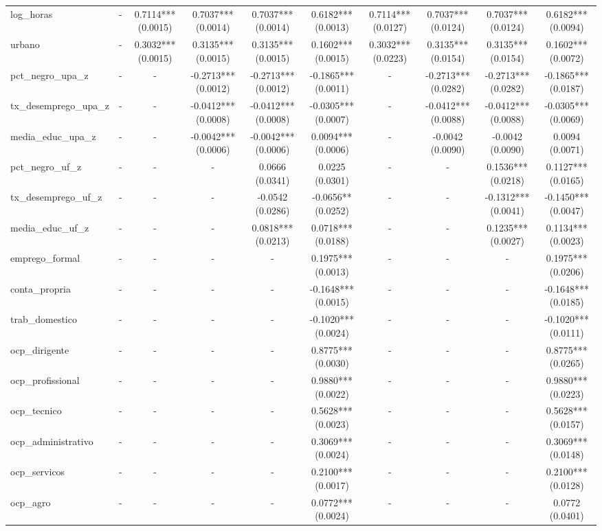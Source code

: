 \begin{table}
\begin{tabular}{lccccccccc}
log_horas & - & 0.7114*** (0.0015) & 0.7037*** (0.0014) & 0.7037*** (0.0014) & 0.6182*** (0.0013) & 0.7114*** (0.0127) & 0.7037*** (0.0124) & 0.7037*** (0.0124) & 0.6182*** (0.0094) \\
urbano & - & 0.3032*** (0.0015) & 0.3135*** (0.0015) & 0.3135*** (0.0015) & 0.1602*** (0.0015) & 0.3032*** (0.0223) & 0.3135*** (0.0154) & 0.3135*** (0.0154) & 0.1602*** (0.0072) \\
pct_negro_upa_z & - & - & -0.2713*** (0.0012) & -0.2713*** (0.0012) & -0.1865*** (0.0011) & - & -0.2713*** (0.0282) & -0.2713*** (0.0282) & -0.1865*** (0.0187) \\
tx_desemprego_upa_z & - & - & -0.0412*** (0.0008) & -0.0412*** (0.0008) & -0.0305*** (0.0007) & - & -0.0412*** (0.0088) & -0.0412*** (0.0088) & -0.0305*** (0.0069) \\
media_educ_upa_z & - & - & -0.0042*** (0.0006) & -0.0042*** (0.0006) & 0.0094*** (0.0006) & - & -0.0042 (0.0090) & -0.0042 (0.0090) & 0.0094 (0.0071) \\
pct_negro_uf_z & - & - & - & 0.0666 (0.0341) & 0.0225 (0.0301) & - & - & 0.1536*** (0.0218) & 0.1127*** (0.0165) \\
tx_desemprego_uf_z & - & - & - & -0.0542 (0.0286) & -0.0656** (0.0252) & - & - & -0.1312*** (0.0041) & -0.1450*** (0.0047) \\
media_educ_uf_z & - & - & - & 0.0818*** (0.0213) & 0.0718*** (0.0188) & - & - & 0.1235*** (0.0027) & 0.1134*** (0.0023) \\
emprego_formal & - & - & - & - & 0.1975*** (0.0013) & - & - & - & 0.1975*** (0.0206) \\
conta_propria & - & - & - & - & -0.1648*** (0.0015) & - & - & - & -0.1648*** (0.0185) \\
trab_domestico & - & - & - & - & -0.1020*** (0.0024) & - & - & - & -0.1020*** (0.0111) \\
ocp_dirigente & - & - & - & - & 0.8775*** (0.0030) & - & - & - & 0.8775*** (0.0265) \\
ocp_profissional & - & - & - & - & 0.9880*** (0.0022) & - & - & - & 0.9880*** (0.0223) \\
ocp_tecnico & - & - & - & - & 0.5628*** (0.0023) & - & - & - & 0.5628*** (0.0157) \\
ocp_administrativo & - & - & - & - & 0.3069*** (0.0024) & - & - & - & 0.3069*** (0.0148) \\
ocp_servicos & - & - & - & - & 0.2100*** (0.0017) & - & - & - & 0.2100*** (0.0128) \\
ocp_agro & - & - & - & - & 0.0772*** (0.0024) & - & - & - & 0.0772 (0.0401) \\

\end{tabular}
\end{table}

